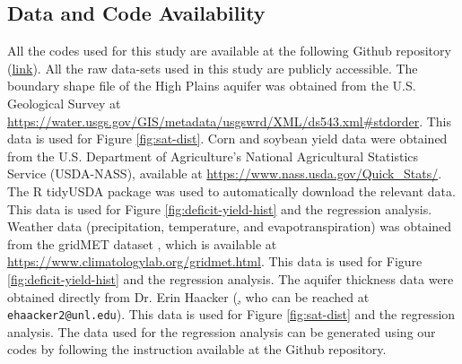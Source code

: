 \documentclass[
]{article}
\begin{document}
\hypertarget{data-code-availability}{%
\subsection{Data and Code Availability}\label{data-availability}}
All the codes used for this study are available at the following Github repository (\href{https://github.com/tmieno2/Drought-Production-Risk-Aquifer}{link}). All the raw data-sets used in this study are publicly accessible. The boundary shape file of the High Plains aquifer was obtained from the U.S. Geological Survey at \url{https://water.usgs.gov/GIS/metadata/usgswrd/XML/ds543.xml#stdorder}. This data is used for Figure \ref{fig:sat-dist}. Corn and soybean yield data were obtained from the U.S. Department of Agriculture’s National Agricultural Statistics Service (USDA-NASS), available at \url{https://www.nass.usda.gov/Quick_Stats/}. The R tidyUSDA package was used to automatically download the relevant data. This data is used for Figure \ref{fig:deficit-yield-hist} and the regression analysis. Weather data (precipitation, temperature, and evapotranspiration) was obtained from the gridMET dataset \citep{Abatzoglou2013}, which is available at \url{https://www.climatologylab.org/gridmet.html}. This data is used for Figure \ref{fig:deficit-yield-hist} and the regression analysis. The aquifer thickness data were obtained directly from Dr. Erin Haacker (\href{mailto:ehaacker2@unl.edu}, who can be reached at {\nolinkurl{ehaacker2@unl.edu}}). This data is used for Figure \ref{fig:sat-dist} and the regression analysis. The data used for the regression analysis can be generated using our codes by following the instruction available at the Github repository. 


\clearpage





\end{document}
